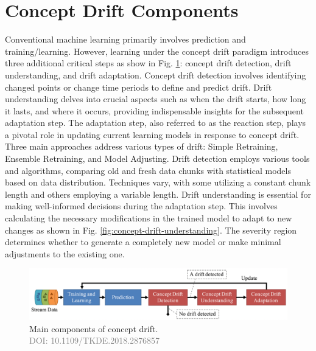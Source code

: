 \section{Concept Drift Components}
\label{sec:background_concept_drift_components}
Conventional machine learning primarily involves prediction and training/learning. However, learning under the concept drift paradigm introduces three additional critical steps as show in Fig. \ref{fig:concept-drift-components}: concept drift detection, drift understanding, and drift adaptation. Concept drift detection involves identifying changed points or change time periods to define and predict drift. Drift understanding delves into crucial aspects such as when the drift starts, how long it lasts, and where it occurs, providing indispensable insights for the subsequent adaptation step.  
The adaptation step, also referred to as the reaction step, plays a pivotal role in updating current learning models in response to concept drift. Three main approaches address various types of drift: Simple Retraining, Ensemble Retraining, and Model Adjusting. Drift detection employs various tools and algorithms, comparing old and fresh data chunks with statistical models based on data distribution. Techniques vary, with some utilizing a constant chunk length and others employing a variable length.
Drift understanding is essential for making well-informed decisions during the adaptation step. This involves calculating the necessary modifications in the trained model to adapt to new changes as shown in Fig. \ref{fig:concept-drift-understanding}. The severity region determines whether to generate a completely new model or make minimal adjustments to the existing one.

 
\begin{figure}[!ht]
    \centering
    \includegraphics[width=.9\textwidth]{2_Background/figures/concept_drift_components.png}
    \caption{Main components of concept drift. \\ \textcolor{gray}{\fontsize{10}{0}\selectfont DOI: 10.1109/TKDE.2018.2876857}}

    \label{fig:concept-drift-components}
\end{figure}


